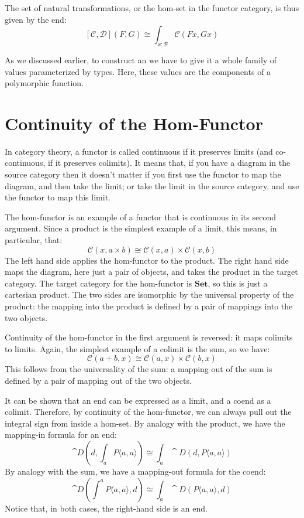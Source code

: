 \documentclass[DaoFP]{subfiles}
\begin{document}
The set of natural transformations, or the hom-set in the functor category, is thus given by the end:
\[ [\mathcal{C}, \mathcal{D}] (F, G) \cong \int_{x \colon  \mathcal{B}} \mathcal{C}(F x, G x)\]

As we discussed earlier, to construct an  we have to give it a whole family of values parameterized by types. Here, these values are the components of a polymorphic function. 

\section{Continuity of the Hom-Functor}

In category theory, a functor is called continuous if it preserves limits (and co-continuous, if it preserves colimits). It means that, if you have a diagram in the source category then it doesn't matter if you first use the functor to map the diagram, and then take the limit; or take the limit in the source category, and use the functor to map this limit. 

The hom-functor is an example of a functor that is continuous in its second argument. Since a product is the simplest example of a limit, this means, in particular, that:
\[ \mathcal{C}(x, a \times b) \cong \mathcal{C}(x, a) \times \mathcal{C}(x, b) \]
The left hand side applies the hom-functor to the product. The right hand side maps the diagram, here just a pair of objects, and takes the product in the target category. The target category for the hom-functor is $\mathbf{Set}$, so this is just a cartesian product. The two sides are isomorphic by the universal property of the product: the mapping into the product is defined by a pair of mappings into the two objects. 

Continuity of the hom-functor in the first argument is reversed: it maps colimits to limits. Again, the simplest example of a colimit is the sum, so we have:
\[ \mathcal{C}(a + b, x) \cong \mathcal{C}(a, x) \times \mathcal{C}(b, x) \]
This follows from the universality of the sum: a mapping out of the sum is defined by a pair of mapping out of the two objects.

It can be shown that an end can be expressed as a limit, and a coend as a colimit. Therefore, by continuity of the hom-functor, we can always pull out the integral sign from inside a hom-set. By analogy with the product, we have the mapping-in formula for an end:
\[\cat D\left(d, \int_a P\langle a, a \rangle \right) \cong \int_a \cat D(d, P\langle a, a \rangle) \]
By analogy with the sum, we have a mapping-out formula for the coend:
\[\cat D\left( \int^a P\langle a, a \rangle , d \right) \cong \int_a \cat D(P\langle a, a \rangle, d) \]
Notice that, in both cases, the right-hand side is an end.
\end{document}
